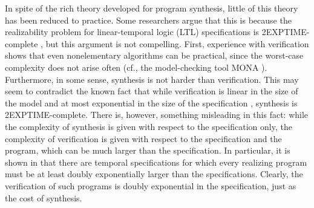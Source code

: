 In spite of the rich theory developed for program synthesis, little of
this theory has been reduced to practice. 
Some researchers argue that this is because the realizability problem
for linear-temporal logic (LTL) specifications is 2EXPTIME-complete
\cite{PnRo89,Rosner92}, but this argument is not compelling. First,
experience with verification shows that even nonelementary algorithms
can be practical, since the worst-case complexity does not arise often
(cf., the model-checking tool MONA \cite{ElgaardKM98}). Furthermore,
in some sense, synthesis is not harder than verification. This may
seem to contradict the known fact that while verification is linear in
the size of the model and at most exponential in the size of the
specification \cite{ClarkeGP:99-ModelChecking}, synthesis is
2EXPTIME-complete. There is, however, something misleading in this
fact: while the complexity of synthesis is given with respect to the
specification only, the complexity of verification is given with
respect to the specification and the program, which can be much larger
than the specification. In particular, it is shown in \cite{Rosner92}
that there are temporal specifications for which every realizing
program must be at least doubly exponentially larger than the
specifications. Clearly, the verification of such programs is doubly
exponential in the specification, just as the cost of synthesis.


